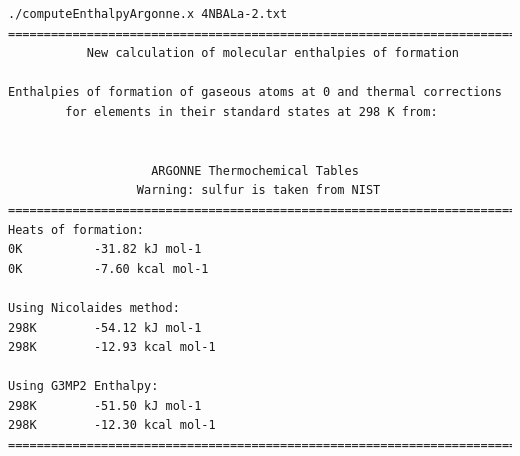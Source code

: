 \newpage

\begin{lstlisting}[caption = Output de 4NBALa-2.txt en EnthalpyArgonne]
./computeEnthalpyArgonne.x 4NBALa-2.txt
========================================================================
           New calculation of molecular enthalpies of formation                               
                                                                                                   
Enthalpies of formation of gaseous atoms at 0 and thermal corrections 
        for elements in their standard states at 298 K from:
                                                                                                                  
          
                    ARGONNE Thermochemical Tables                                    
                  Warning: sulfur is taken from NIST                                                                                                       
========================================================================
Heats of formation:
0K          -31.82 kJ mol-1
0K          -7.60 kcal mol-1

Using Nicolaides method:
298K        -54.12 kJ mol-1
298K        -12.93 kcal mol-1

Using G3MP2 Enthalpy:
298K        -51.50 kJ mol-1
298K        -12.30 kcal mol-1
========================================================================
\end{lstlisting}



